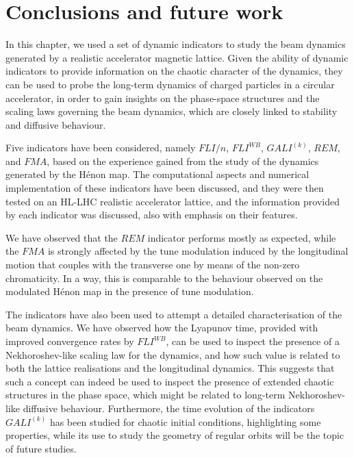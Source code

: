 \section{Conclusions and future work}\label{sec:8:conclusions}

In this chapter, we used a set of dynamic indicators to study the beam dynamics generated by a realistic accelerator magnetic lattice. Given the ability of dynamic indicators to provide information on the chaotic character of the dynamics, they can be used to probe the long-term dynamics of charged particles in a circular accelerator, in order to gain insights on the phase-space structures and the scaling laws governing the beam dynamics, which are closely linked to stability and diffusive behaviour.

\FloatBarrier

Five indicators have been considered, namely $FLI/n$, $FLI^{WB}$, $GALI^{(k)}$, $REM$, and $FMA$, based on the experience gained from the study of the dynamics generated by the H\'enon map. The computational aspects and numerical implementation of these indicators have been discussed, and they were then tested on an HL-LHC realistic accelerator lattice, and the information provided by each indicator was discussed, also with emphasis on their features.

We have observed that the $REM$ indicator performs mostly as expected, while the $FMA$ is strongly affected by the tune modulation induced by the longitudinal motion that couples with the transverse one by means of the non-zero chromaticity. In a way, this is comparable to the behaviour observed on the modulated Hénon map in the presence of tune modulation. 

The indicators have also been used to attempt a detailed characterisation of the beam dynamics. We have observed how the Lyapunov time, provided with improved convergence rates by $FLI^{WB}$, can be used to inspect the presence of a Nekhoroshev-like scaling law for the dynamics, and how such value is related to both the lattice realisations and the longitudinal dynamics. This suggests that such a concept can indeed be used to inspect the presence of extended chaotic structures in the phase space, which might be related to long-term Nekhoroshev-like diffusive behaviour. Furthermore, the time evolution of the indicators $GALI^{(k)}$ has been studied for chaotic initial conditions, highlighting some properties, while its use to study the geometry of regular orbits will be the topic of future studies.
